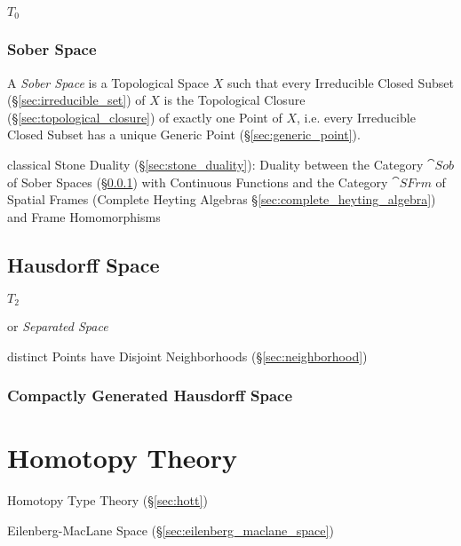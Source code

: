 $\xspace{T}_0$



\subsubsection{Sober Space}\label{sec:sober_space}

A \emph{Sober Space} is a Topological Space $X$ such that every Irreducible
Closed Subset (\S\ref{sec:irreducible_set}) of $X$ is the Topological Closure
(\S\ref{sec:topological_closure}) of exactly one Point of $X$, i.e. every
Irreducible Closed Subset has a unique Generic Point
(\S\ref{sec:generic_point}).

classical Stone Duality (\S\ref{sec:stone_duality}): Duality between the
Category $\cat{Sob}$ of Sober Spaces (\S\ref{sec:sober_space}) with Continuous
Functions and the Category $\cat{SFrm}$ of Spatial Frames (Complete Heyting
Algebras \S\ref{sec:complete_heyting_algebra}) and Frame Homomorphisms



\subsection{Hausdorff Space}\label{sec:hausdorff_space}

$\xspace{T}_2$

or \emph{Separated Space}

distinct Points have Disjoint Neighborhoods (\S\ref{sec:neighborhood})



\subsubsection{Compactly Generated Hausdorff Space}
\label{sec:compact_hausdorff}



\section{Homotopy Theory}\label{sec:homotopy_theory}

Homotopy Type Theory (\S\ref{sec:hott})

Eilenberg-MacLane Space (\S\ref{sec:eilenberg_maclane_space})



